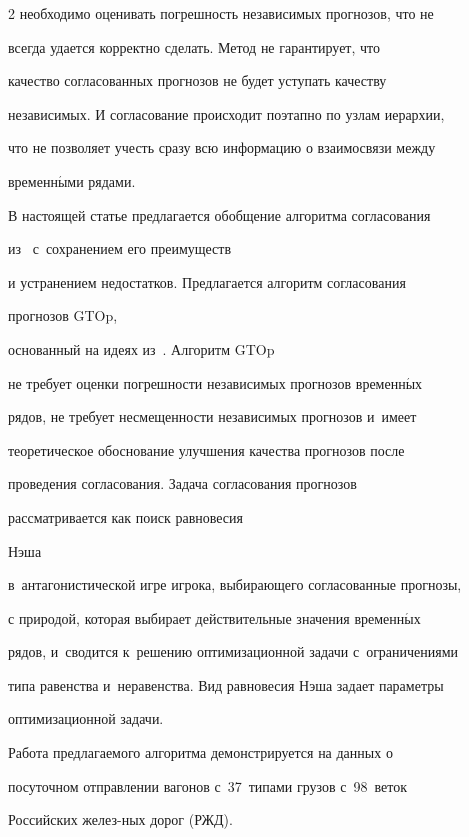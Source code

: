 \begin{multicols}{2}
необходимо оценивать погрешность независимых прогнозов, что не

всегда удается корректно сделать. Метод не гарантирует, что

качество согласованных прогнозов не будет уступать качеству

независимых. И согласование происходит поэтапно по узлам иерархии,

что не позволяет учесть сразу всю информацию о взаимосвязи между

временн$\acute{\mbox{ы}}$ми рядами.



В настоящей статье предлагается обобщение алгоритма согласования

из~\cite{stenina2014reconciliation} с~сохранением его преимуществ

и устранением недостатков. Предлагается алгоритм согласования

прогнозов GTOp,

основанный на идеях из~\cite{vanerven:hal-00920559}. Алгоритм GTOp

не требует оценки погрешности независимых прогнозов временн$\acute{\mbox{ы}}$х

рядов, не требует не\-сме\-щен\-ности независимых прогнозов и~имеет

теоретическое обоснование улучшения качества прогнозов после

проведения согласования. Задача согласования прогнозов

рассматривается как поиск равновесия

Нэша~\cite{petrosyan1998theory, menshikov2010lections}

в~антагонистической игре игрока, выбирающего согласованные прогнозы,

с природой, которая выбирает действительные значения временн$\acute{\mbox{ы}}$х

рядов, и~сводится к~решению оптимизационной задачи с~ограничениями

типа равенства и~неравенства. Вид равновесия Нэша задает параметры

оптимизационной задачи.



Работа предлагаемого алгоритма демонстрируется на данных о

посуточном отправлении вагонов с~37~типами грузов с~98~веток

Российских желез-\linebreak ных дорог (РЖД).


\end{multicols}
